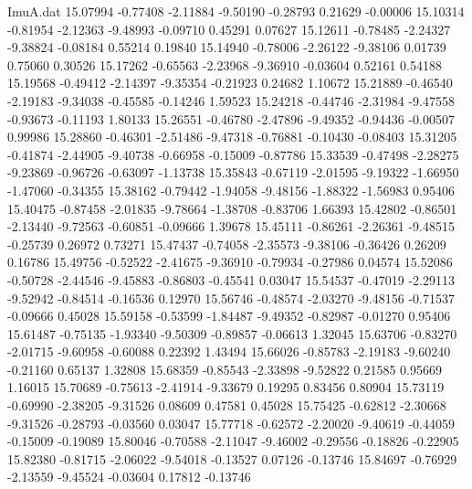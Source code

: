 \begin{filecontents}{ImuA.dat}
  15.07994   -0.77408   -2.11884   -9.50190   -0.28793    0.21629   -0.00006
  15.10314   -0.81954   -2.12363   -9.48993   -0.09710    0.45291    0.07627
  15.12611   -0.78485   -2.24327   -9.38824   -0.08184    0.55214    0.19840
  15.14940   -0.78006   -2.26122   -9.38106    0.01739    0.75060    0.30526
  15.17262   -0.65563   -2.23968   -9.36910   -0.03604    0.52161    0.54188
  15.19568   -0.49412   -2.14397   -9.35354   -0.21923    0.24682    1.10672
  15.21889   -0.46540   -2.19183   -9.34038   -0.45585   -0.14246    1.59523
  15.24218   -0.44746   -2.31984   -9.47558   -0.93673   -0.11193    1.80133
  15.26551   -0.46780   -2.47896   -9.49352   -0.94436   -0.00507    0.99986
  15.28860   -0.46301   -2.51486   -9.47318   -0.76881   -0.10430   -0.08403
  15.31205   -0.41874   -2.44905   -9.40738   -0.66958   -0.15009   -0.87786
  15.33539   -0.47498   -2.28275   -9.23869   -0.96726   -0.63097   -1.13738
  15.35843   -0.67119   -2.01595   -9.19322   -1.66950   -1.47060   -0.34355
  15.38162   -0.79442   -1.94058   -9.48156   -1.88322   -1.56983    0.95406
  15.40475   -0.87458   -2.01835   -9.78664   -1.38708   -0.83706    1.66393
  15.42802   -0.86501   -2.13440   -9.72563   -0.60851   -0.09666    1.39678
  15.45111   -0.86261   -2.26361   -9.48515   -0.25739    0.26972    0.73271
  15.47437   -0.74058   -2.35573   -9.38106   -0.36426    0.26209    0.16786
  15.49756   -0.52522   -2.41675   -9.36910   -0.79934   -0.27986    0.04574
  15.52086   -0.50728   -2.44546   -9.45883   -0.86803   -0.45541    0.03047
  15.54537   -0.47019   -2.29113   -9.52942   -0.84514   -0.16536    0.12970
  15.56746   -0.48574   -2.03270   -9.48156   -0.71537   -0.09666    0.45028
  15.59158   -0.53599   -1.84487   -9.49352   -0.82987   -0.01270    0.95406
  15.61487   -0.75135   -1.93340   -9.50309   -0.89857   -0.06613    1.32045
  15.63706   -0.83270   -2.01715   -9.60958   -0.60088    0.22392    1.43494
  15.66026   -0.85783   -2.19183   -9.60240   -0.21160    0.65137    1.32808
  15.68359   -0.85543   -2.33898   -9.52822    0.21585    0.95669    1.16015
  15.70689   -0.75613   -2.41914   -9.33679    0.19295    0.83456    0.80904
  15.73119   -0.69990   -2.38205   -9.31526    0.08609    0.47581    0.45028
  15.75425   -0.62812   -2.30668   -9.31526   -0.28793   -0.03560    0.03047
  15.77718   -0.62572   -2.20020   -9.40619   -0.44059   -0.15009   -0.19089
  15.80046   -0.70588   -2.11047   -9.46002   -0.29556   -0.18826   -0.22905
  15.82380   -0.81715   -2.06022   -9.54018   -0.13527    0.07126   -0.13746
  15.84697   -0.76929   -2.13559   -9.45524   -0.03604    0.17812   -0.13746

\end{filecontents}
